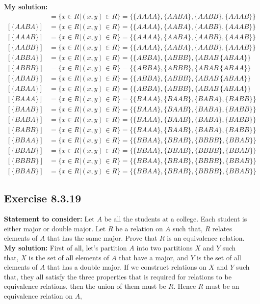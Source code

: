 \documentclass{report}
\newcommand{\mAlign}[1]{\begin{align*}#1\end{align*}}
\newcommand{\In}{\! \in \!}
\newcommand{\assignmentDescription}{\textbf{Statement to consider: }}
\newcommand{\solution}{\textbf{My solution: }}
\newcommand{\Exercise}[1]{\subsection{Exercise #1}}
\begin{document}
	\solution
	\mAlign{
		[\{AAAA\}] &= \{x \in R | (x,y) \In R\} = \{\{AAAA\},\{AABA\},\{AABB\},\{AAAB\}\} \\
		[\{AABA\}] &= \{x \in R | (x,y) \In R\} = \{\{AAAA\},\{AABA\},\{AABB\},\{AAAB\}\} \\
		[\{AAAB\}] &= \{x \in R | (x,y) \In R\} = \{\{AAAA\},\{AABA\},\{AABB\},\{AAAB\}\} \\
		[\{AABB\}] &= \{x \in R | (x,y) \In R\} = \{\{AAAA\},\{AABA\},\{AABB\},\{AAAB\}\} \\
		[\{ABBA\}] &= \{x \in R | (x,y) \In R\} = \{\{ABBA\},\{ABBB\},\{ABAB\,\{ABAA\}\} \\
		[\{ABBB\}] &= \{x \in R | (x,y) \In R\} = \{\{ABBA\},\{ABBB\},\{ABAB\,\{ABAA\}\} \\
		[\{ABAB\}] &= \{x \in R | (x,y) \In R\} = \{\{ABBA\},\{ABBB\},\{ABAB\,\{ABAA\}\} \\
		[\{ABAA\}] &= \{x \in R | (x,y) \In R\} = \{\{ABBA\},\{ABBB\},\{ABAB\,\{ABAA\}\} \\
		[\{BAAA\}] &= \{x \in R | (x,y) \In R\} = \{\{BAAA\},\{BAAB\},\{BABA\},\{BABB\}\} \\
		[\{BAAB\}] &= \{x \in R | (x,y) \In R\} = \{\{BAAA\},\{BAAB\},\{BABA\},\{BABB\}\} \\
		[\{BABA\}] &= \{x \in R | (x,y) \In R\} = \{\{BAAA\},\{BAAB\},\{BABA\},\{BABB\}\} \\
		[\{BABB\}] &= \{x \in R | (x,y) \In R\} = \{\{BAAA\},\{BAAB\},\{BABA\},\{BABB\}\} \\
		[\{BBAA\}] &= \{x \in R | (x,y) \In R\} = \{\{BBAA\},\{BBAB\},\{BBBB\},\{BBAB\}\} \\
		[\{BBAB\}] &= \{x \in R | (x,y) \In R\} = \{\{BBAA\},\{BBAB\},\{BBBB\},\{BBAB\}\} \\
		[\{BBBB\}] &= \{x \in R | (x,y) \In R\} = \{\{BBAA\},\{BBAB\},\{BBBB\},\{BBAB\}\} \\
		[\{BBAB\}] &= \{x \in R | (x,y) \In R\} = \{\{BBAA\},\{BBAB\},\{BBBB\},\{BBAB\}\}}
	
	\Exercise{8.3.19}
	\assignmentDescription
	Let $A$ be all the students at a college. Each student is either major or double major. Let $R$ be a relation on $A$ such that, $R$ relates elements of $A$ that has the same major. Prove that $R$ is an equivalence relation.\\
	
	\solution
	First of all, let's partition $A$ into two partitions $X$ and $Y$ such that, $X$ is the set of all elements of $A$ that have a major, and $Y$ is the set of all elements of $A$ that has a double major. If we construct relations on $X$ and $Y$ such that, they all satisfy the three properties that is required for relations to be equivalence relations, then the union of them must be $R$. Hence $R$ must be an equivalence relation on $A$, \\
	
\end{document}
